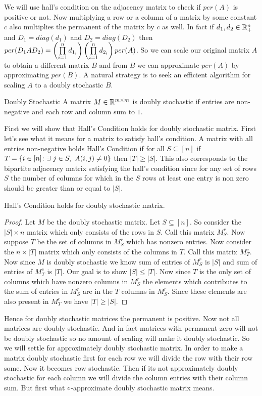 We will use hall's condition on the adjacency matrix to check if $per(A)$ is positive or not. Now multiplying a row or a column of a matrix by some constant $c$ also multiplies the permanent of the matrix by $c$ as well. In fact if $d_1,d_2\in\mathbb{R}_+^n$ and $D_1=diag(d_1)$ and $D_2=diag(D_2)$  then $per(D_1AD_2)=\left(\prod\limits_{i=1}^nd_{1_i}\right)\left(\prod\limits_{i=1}^nd_{2_i}\right)per(A)$. So we can scale our original matrix $A$ to obtain a different matrix $B$ and from $B$ we can approximate $per(A)$ by approximating $per(B)$. A natural strategy is to seek an efficient algorithm for scaling $A$ to a doubly stochastic $B$.
\begin{Definition}{Doubly Stochastic}{}
	A matrix $M\in\mathbb{R}^{m\times m}$ is doubly stochastic if entries are non-negative and each row and column sum to $1$.
\end{Definition}

First we will show that Hall's Condition holds for doubly stochastic matrix. First let's see what it means for a matrix to satisfy hall's condition. A matrix with all entries non-negative holds Hall's Condition if for all $S\subseteq [n]$ if $T=\{i\in [n]\colon \exs\ j\in S,\ A(i,j)\neq 0\}$ then $|T|\geq |S|$. This also corresponds to the bipartite adjacency matrix satisfying the hall's condition since for any set of rows $S$ the number of columns for which in the $S$ rows at least one entry is non zero should be greater than or equal to $|S|$.
\begin{lemma}{}{}
	Hall's Condition holds for doubly stochastic matrix.
\end{lemma}
\begin{proof}
	Let $M$ be the doubly stochastic matrix. Let $S\subseteq [n]$. So consider the $|S|\times n$ matrix which only consists of the rows in $S$. Call this matrix $M_S^r$. Now suppose $T$ be the set of columns in $M_S^r$ which has nonzero entries. Now consider the $n\times |T|$ matrix which only consists of the columns in $T$. Call this matrix $M_T^c$. Now since $M$ is doubly stochastic we know sum of entries of $M_S^r$ is $|S|$ and sum of entries of $M_T^c$ is $|T|$. Our goal is to show $|S|\leq |T|$. Now since $T$ is the only set of columns which have nonzero columns in $M_S^r$ the elements which contributes to the sum of entries in $M_S^r$ are in the  $T$ columns in $M_S^r$. Since these elements are also present in $M_T^c$ we have $|T|\geq |S|$. 
\end{proof}

Hence for doubly stochastic matrices the permanent is positive. Now not all matrices are doubly stochastic. And in fact matrices with permanent zero will not be doubly stochastic so no amount of scaling will make it doubly stochastic. So we will settle for approximately doubly stochastic matrix. In order to make a matrix doubly stochastic first for each row we will divide the row with their row some. Now it becomes row stochastic. Then if its not approximately doubly stochastic for each column we will divide the column entries with their column sum. But first what $\epsilon$-approximate doubly stochastic matrix means.

